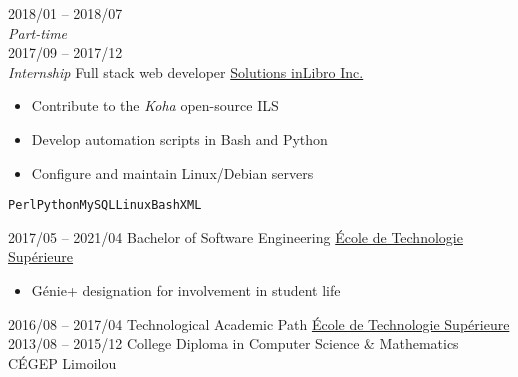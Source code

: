 \documentclass[9pt]{developercv} %
\begin{document}
\begin{minipage}[t]{0.8\textwidth}
\begin{entrylist}
{		}
	\entry
		{2018/01 -- 2018/07\\{\small\emph{Part-time}}\\2017/09 -- 2017/12\\{\small\emph{Internship}}}
		{Full stack web developer}
		{\href{https://inlibro.com/en/}{Solutions inLibro Inc.}}
		{
			\vspace{-14pt}
			\begin{itemize}
				\renewcommand{\labelitemi}{\raisebox{.45ex}{\rule{.6ex}{.6ex}}}
				\setlength\itemsep{-1pt}
				\item Contribute to the \emph{Koha} open-source ILS
				\item Develop automation scripts in Bash and Python
				\item Configure and maintain Linux/Debian servers
			\end{itemize}
			\vspace{-4pt}
			\texttt{Perl}\slashsep\texttt{Python}\slashsep\texttt{MySQL}\slashsep\texttt{Linux}\slashsep\texttt{Bash}\slashsep\texttt{XML}
		}
\end{entrylist}



\begin{entrylist}
	\setlength\itemsep{-1pt}
	\entry
		{2017/05 -- 2021/04}
		{Bachelor of Software Engineering}
		{\href{https://etsmtl.ca}{École de Technologie Supérieure}}
		{
			\vspace{-14pt}
			\begin{itemize}
				\renewcommand{\labelitemi}{\raisebox{.45ex}{\rule{.6ex}{.6ex}}}
				\setlength\itemsep{-1pt}
				\item Génie+ designation for involvement in student life
			\end{itemize}
			\vspace{-8pt}
		}
	\entry
		{2016/08 -- 2017/04}
		{Technological Academic Path}
		{\href{https://etsmtl.ca}{École de Technologie Supérieure}}
		{\vspace{-14pt}}
	\entry
		{2013/08 -- 2015/12}
		{College Diploma in Computer Science \& Mathematics}
		{CÉGEP Limoilou}
		{\vspace{-14pt}}
\end{entrylist}



\end{minipage}
\end{document}
